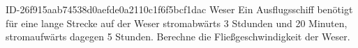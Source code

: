 \begin{exercise}
      {ID-26f915aab74538d0aefde0a2110c1f6f5bcf1dac}
      {Weser}
  \ifproblem\problem
    Ein Ausflugsschiff benötigt für eine  lange Strecke auf der Weser
    stromabwärts 3 Stdunden und 20 Minuten, stromaufwärts dagegen 5 Stunden.
    Berechne die Fließgeschwindigkeit der Weser.
  \fi
\end{exercise}
